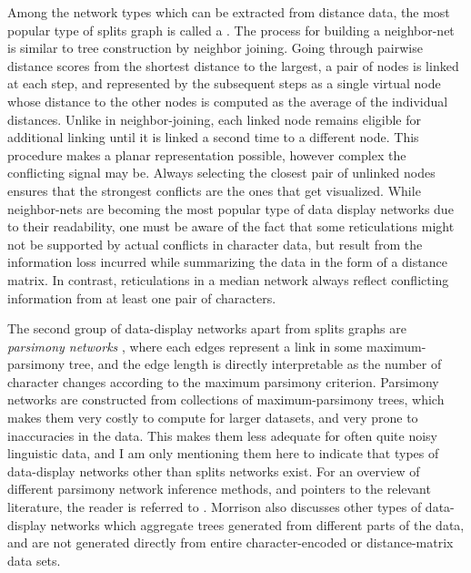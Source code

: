 Among the network types which can be extracted from distance data, the most popular type of splits graph is called a \textit{}. The process for building a neighbor-net is similar to tree construction by neighbor joining. Going through pairwise distance scores from the shortest distance to the largest, a pair of nodes is linked at each step, and represented by the subsequent steps as a single virtual node whose distance to the other nodes is computed as the average of the individual distances. Unlike in neighbor-joining, each linked node remains eligible for additional linking until it is linked a second time to a different node. This procedure makes a planar representation possible, however complex the conflicting signal may be. Always selecting the closest pair of unlinked nodes ensures that the strongest conflicts are the ones that get visualized. While neighbor-nets are becoming the most popular type of data display networks due to their readability, one must be aware of the fact that 
some reticulations might not be supported by actual conflicts in character data, but result from the information loss incurred while summarizing the data in the form of a distance matrix. In contrast, reticulations in a median network always reflect conflicting information from at least one pair of characters.

The second group of data-display networks apart from splits graphs are \textit{parsimony networks} , where each edges represent a link in some maximum-parsimony tree, and the edge length is directly interpretable as the number of character changes according to the maximum parsimony criterion. Parsimony networks are constructed from collections of maximum-parsimony trees, which makes them very costly to compute for larger datasets, and very prone to inaccuracies in the data. This makes them less adequate for often quite noisy linguistic data, and I am only mentioning them here to indicate that types of data-display networks other than splits networks exist. For an overview of different parsimony network inference methods, and pointers to the relevant literature, the reader is referred to \citet[Section 3.3.1]{morrison2011}. Morrison also discusses other types of data-display networks which aggregate trees generated from different parts of the data, and are not generated directly from entire character-encoded or distance-matrix data sets.

